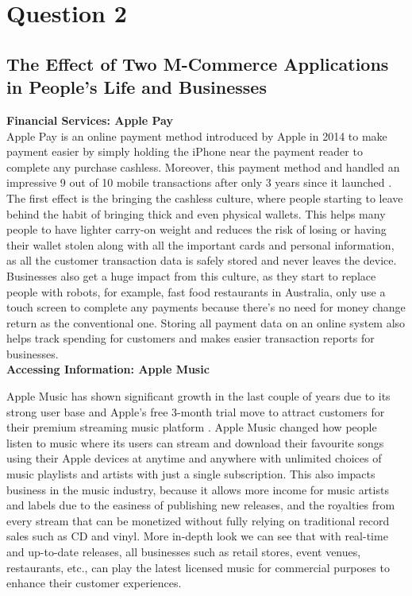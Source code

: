 \documentclass[12pt,a4paper]{article}
\begin{document}
\pagebreak%

\setcounter{page}{2}

\section{Question 2}
\subsection{The Effect of Two M-Commerce Applications in People's Life and Businesses}
\label{sec:Question 2}
\textbf{Financial Services: Apple Pay}\\
\noindent Apple Pay is an online payment method introduced by Apple in 2014 to make payment easier by simply holding the iPhone near the payment reader to complete any purchase cashless. Moreover, this payment method and handled an impressive 9 out of 10 mobile transactions after only 3 years since it launched \citep{Ref2.1}. The first effect is the bringing the cashless culture, where people starting to leave behind the habit of bringing thick and even physical wallets. This helps many people to have lighter carry-on weight and reduces the risk of losing or having their wallet stolen along with all the important cards and personal information, as all the customer transaction data is safely stored and never leaves the device. Businesses also get a huge impact from this culture, as they start to replace people with robots, for example, fast food restaurants in Australia, only use a touch screen to complete any payments because there’s no need for money change return as the conventional one. Storing all payment data on an online system also helps track spending for customers and makes easier transaction reports for businesses.\\

\noindent\textbf{Accessing Information: Apple Music}

\noindent Apple Music has shown significant growth in the last couple of years due to its strong user base and Apple’s free 3-month trial move to attract customers for their premium streaming music platform \citep{Ref2.2}. Apple Music changed how people listen to music where its users can stream and download their favourite songs using their Apple devices at anytime and anywhere with unlimited choices of music playlists and artists with just a single subscription. This also impacts business in the music industry, because it allows more income for music artists and labels due to the easiness of publishing new releases, and the royalties from every stream that can be monetized without fully relying on traditional record sales such as CD and vinyl. More in-depth look we can see that with real-time and up-to-date releases, all businesses such as retail stores, event venues, restaurants, etc., can play the latest licensed music for commercial purposes to enhance their customer experiences.
\end{document}
